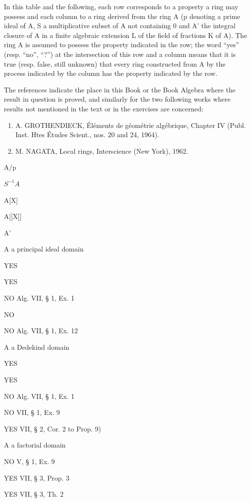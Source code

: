 
In this table and the following, each row corresponds to a property a ring may possess and each column to a ring derived from the ring A (p denoting a prime ideal of A, S a multiplicative subset of A not containing 0 and A' the integral closure of A in a finite algebraic extension L of the field of fractions K of A). The ring A is assumed to possess the property indicated in the row; the word ``yes'' (resp. ``no'', ``?'') at the intersection of this row and a column means that it is true (resp. false, still unknown) that every ring constructed from A by the process indicated by the column has the property indicated by the row.

The references indicate the place in this Book or the Book Algebra where the result in question is proved, and similarly for the two following works where results not mentioned in the text or in the exercises are concerned:

\begin{enumerate}
\def\labelenumi{(\arabic{enumi})}
\item
  A. GROTHENDIECK, Éléments de géométrie algébrique, Chapter IV (Publ. Inst. Htes Études Scient., nos. 20 and 24, 1964).
\item
  M. NAGATA, Local rings, Interscience (New York), 1962.
\end{enumerate}

A/p

\(S^{-1}A\)

A{[}X{]}

A{[}{[}X{]}{]}

A'

A a principal ideal domain

YES

YES

NO Alg. VII, § 1, Ex. 1

NO

NO Alg. VII, § 1, Ex. 12

A a Dedekind domain

YES

YES

NO Alg. VII, § 1, Ex. 1

NO VII, § 1, Ex. 9

YES VII, § 2, Cor. 2 to Prop. 9)

A a factorial domain

NO V, § 1, Ex. 9

YES VII, § 3, Prop. 3

YES VII, § 3, Th. 2

